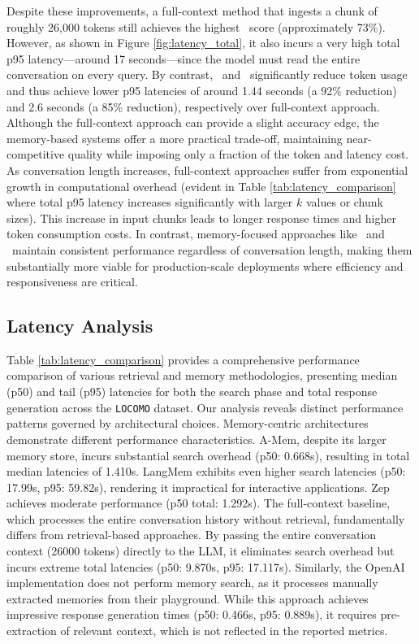 Despite these improvements, a full-context method that ingests a chunk of roughly 26,000 tokens still achieves the highest \Judge~score (approximately 73\%). However, as shown in Figure \ref{fig:latency_total}, it also incurs a very high total p95 latency—around 17 seconds—since the model must read the entire conversation on every query. By contrast, \mem~and \memp~significantly reduce token usage and thus achieve lower p95 latencies of around 1.44 seconds (a 92\% reduction) and 2.6 seconds (a 85\% reduction), respectively over full-context approach. Although the full-context approach can provide a slight accuracy edge, the memory-based systems offer a more practical trade-off, maintaining near-competitive quality while imposing only a fraction of the token and latency cost. 
As conversation length increases, full-context approaches suffer from exponential growth in computational overhead (evident in Table \ref{tab:latency_comparison} where total p95 latency increases significantly with larger $k$ values or chunk sizes). This increase in input chunks leads to longer response times and higher token consumption costs. In contrast, memory-focused approaches like \mem~and \memp~maintain consistent performance regardless of conversation length, making them substantially more viable for production-scale deployments where efficiency and responsiveness are critical.



\subsection{Latency Analysis}
Table \ref{tab:latency_comparison} provides a comprehensive performance comparison of various retrieval and memory methodologies, presenting median (p50) and tail (p95) latencies for both the search phase and total response generation across the \texttt{LOCOMO} dataset. Our analysis reveals distinct performance patterns governed by architectural choices. Memory-centric architectures demonstrate different performance characteristics. A-Mem, despite its larger memory store, incurs substantial search overhead (p50: 0.668s), resulting in total median latencies of 1.410s. LangMem exhibits even higher search latencies (p50: 17.99s, p95: 59.82s), rendering it impractical for interactive applications. Zep achieves moderate performance (p50 total: 1.292s).
The full-context baseline, which processes the entire conversation history without retrieval, fundamentally differs from retrieval-based approaches. By passing the entire conversation context (26000 tokens) directly to the LLM, it eliminates search overhead but incurs extreme total latencies (p50: 9.870s, p95: 17.117s). Similarly, the OpenAI implementation does not perform memory search, as it processes manually extracted memories from their playground. While this approach achieves impressive response generation times (p50: 0.466s, p95: 0.889s), it requires pre-extraction of relevant context, which is not reflected in the reported metrics.

